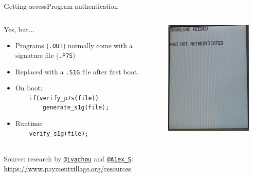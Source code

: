 \documentclass[12pt,aspectratio=169]{beamer}
\begin{document}
\begin{frame}{Getting access}{Program authentication}
\begin{columns}
\begin{column}{0.6\textwidth}
	Yes, but...
	\begin{itemize}
		\item Programs (\texttt{.OUT}) normally come with a signature file (\texttt{.P7S})
		\item Replaced with a \texttt{.S1G} file after first boot.
		
		\item On boot: ~\\
		~~~~\texttt{if(verify\_p7s(file))}~\\
		~~~~~~~~\texttt{generate\_s1g(file);}
		

		\item Runtime: ~\\
		~~~~\texttt{verify\_s1g(file);}
	\end{itemize}
~\\
\footnotesize{
Source: research by \href{https://twitter.com/ivachyou}{\texttt{@ivachou}} and \href{https://twitter.com/A1ex_S}{\texttt{@A1ex\_S}}:~\\
\url{https://www.paymentvillage.org/resources}}
\end{column}
\begin{column}{0.4\textwidth}
	\includegraphics[width=5.5cm]{media/go_not_auth}
\end{column}
\end{columns}
\end{frame}
\end{document}
